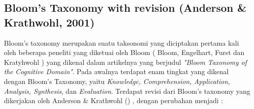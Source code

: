 	\subsection{Bloom's Taxonomy with revision (Anderson \& Krathwohl, 2001)}
	Bloom's taxonomy merupakan suatu taksonomi yang diciptakan pertama kali oleh beberapa peneliti yang diketuai oleh Bloom ( Bloom, Engelhart, Furst dan Kratyhwohl \citeyear{papper.bloom}) yang dikenal dalam artikelnya yang berjudul \textit{"Bloom Taxonomy of the Cognitive Domain"}. Pada awalnya terdapat enam tingkat yang dikenal dengan Bloom's Taxonomy, yaitu \textit{Knowledge, Comprehension, Application, Analysis, Synthesis}, dan \textit{Evaluation}. 
	\linebreak \linebreak
	Terdapat revisi dari Bloom's taxonomy yang dikerjakan oleh Anderson \& Krathwohl (\citeyear{paper.karthwohl}) , dengan perubahan menjadi :

